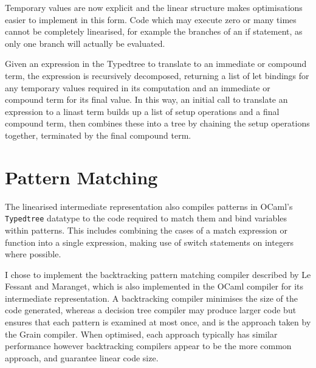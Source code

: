 Temporary values are now explicit and the linear structure makes optimisations easier to implement in this form. Code which may execute zero or many times cannot be completely linearised, for example the branches of an if statement, as only one branch will actually be evaluated. 

Given an expression in the Typedtree to translate to an immediate or compound term, the expression is recursively decomposed, returning a list of let bindings for any temporary values required in its computation and an immediate or compound term for its final value. In this way, an initial call to translate an expression to a linast term builds up a list of setup operations and a final compound term, then combines these into a tree by chaining the setup operations together, terminated by the final compound term.




\section{Pattern Matching}
The linearised intermediate representation also compiles patterns in OCaml's \verb|Typedtree| datatype to the code required to match them and bind variables within patterns. This includes combining the cases of a match expression or function into a single expression, making use of switch statements on integers where possible. 

I chose to implement the backtracking pattern matching compiler described by Le Fessant and Maranget\nocite{ocamlpatternmatch}, which is also implemented in the OCaml compiler for its intermediate representation. A backtracking compiler minimises the size of the code generated, whereas a decision tree compiler may produce larger code but ensures that each pattern is examined at most once, and is the approach taken by the Grain compiler. When optimised, each approach typically has similar performance \nocite{decisiontrees} however backtracking compilers appear to be the more common approach, and guarantee linear code size.


